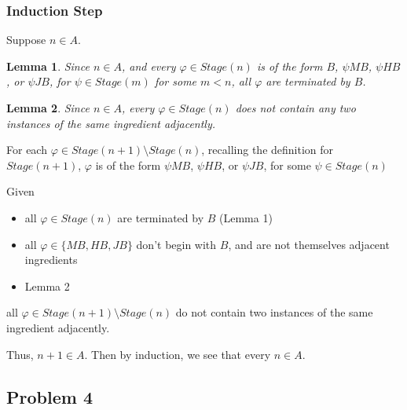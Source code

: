 \documentclass[a4paper]{article}
\newtheorem{lemma}{Lemma}
\newcommand{\SET}[1]{\{ {#1} \}}
\begin{document}
\begin{enumerate}
    \subsubsection*{Induction Step}
    Suppose $n \in A$.
    
    \begin{lemma}
    Since $n \in A$, and every $\varphi \in Stage(n)$ is of the form $B$, $\psi MB$, $\psi HB$, or $\psi JB$, for $\psi \in Stage(m)$ for some $m < n$, all $\varphi$ are terminated by $B$.
    \end{lemma}

    \begin{lemma}
    Since $n \in A$, every $\varphi \in Stage(n)$ does not contain any two instances of the same ingredient adjacently.
    \end{lemma}

        For each $\varphi \in Stage(n + 1) \setminus Stage(n)$, recalling the definition for $Stage(n + 1)$, $\varphi$ is of the form $\psi MB$, $\psi HB$, or $\psi JB$, for some $\psi \in Stage(n)$

        Given \begin{itemize}
            \item all $\varphi \in Stage(n)$ are terminated by $B$ (Lemma 1)
            \item all $\varphi \in \SET{MB, HB, JB}$ don't begin with $B$, and are not themselves adjacent ingredients
            \item Lemma 2
        \end{itemize}
        
        all $\varphi \in Stage(n + 1) \setminus Stage(n)$ do not contain two instances of the same ingredient adjacently. 

        Thus, $n + 1 \in A$. Then by induction, we see that every $n \in A$.
    
\end{enumerate}

\subsection*{Problem 4}
\end{document}
